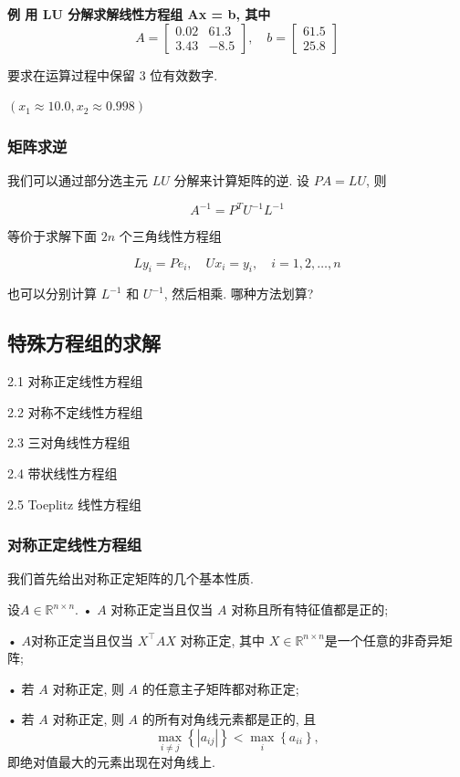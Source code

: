 \documentclass[12pt,a4paper]{article}
\begin{document}
\bfseries{例} 用 LU 分解求解线性方程组 Ax = b, 其中
\begin{equation}
A=\left[\begin{array}{cc}{0.02} & {61.3} \\ {3.43} & {-8.5}\end{array}\right], \quad b=\left[\begin{array}{c}{61.5} \\ {25.8}\end{array}\right]
\end{equation}

要求在运算过程中保留 3 位有效数字.	

$(x_1 ≈ 10.0, x_2 ≈ 0.998)$


\subsubsection{矩阵求逆}
我们可以通过部分选主元 $LU$ 分解来计算矩阵的逆. 设 $P A = LU$, 则

$$
A^{-1}=P^{T} U^{-1} L^{-1}
$$

等价于求解下面 $2n$ 个三角线性方程组

$$
L y_{i}=P e_{i}, \quad U x_{i}=y_{i}, \quad i=1,2, \ldots, n
$$

也可以分别计算 $L^{-1}$ 和 $U^{−1}$, 然后相乘. 哪种方法划算?

\subsection{特殊方程组的求解}

2.1 对称正定线性方程组

2.2 对称不定线性方程组

2.3 三对角线性方程组

2.4 带状线性方程组

2.5 Toeplitz 线性方程组

\subsubsection{对称正定线性方程组}

我们首先给出对称正定矩阵的几个基本性质.

\begin{theorem}
	设$ A ∈ \mathbb{R}^{n×n}$.
	• $A$ 对称正定当且仅当 $A$ 对称且所有特征值都是正的;
	
	• $A $对称正定当且仅当 $X^{⊺}AX$ 对称正定, 其中 $X ∈ \mathbb{R}^{n×n} $是一个任意的非奇异矩阵;
	
	• 若 $A$ 对称正定, 则 $A$ 的任意主子矩阵都对称正定;
	
	• 若 $A$ 对称正定, 则 $A$ 的所有对角线元素都是正的, 且
	$$
	\max _{i \neq j}\left\{\left|a_{i j}\right|\right\}<\max _{i}\left\{a_{i i}\right\}
	,$$即绝对值最大的元素出现在对角线上.
\end{theorem}
\end{document}
